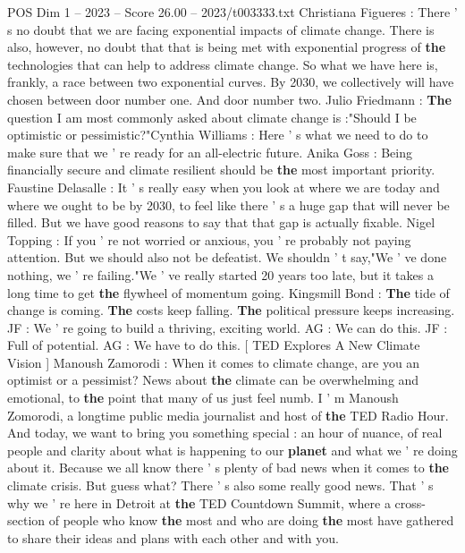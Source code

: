 \begin{textsample}{POS Dim 1 – 2023 – Score 26.00 – 2023/t003333.txt}  \label{ex:f1_pos_063}
Christiana Figueres : There ' s no doubt that we are facing exponential impacts of climate change.
There is also, however, no doubt that that is being met with exponential progress of \textbf{the} technologies that can help to address climate change.
So what we have here is, frankly, a race between two exponential curves.
By 2030, we collectively will have chosen between door number one.
And door number two.
Julio Friedmann : \textbf{The} question I am most commonly asked about climate change is :"Should I be optimistic or pessimistic?"Cynthia Williams : Here ' s what we need to do to make sure that we ' re ready for an all-electric future.
Anika Goss : Being financially secure and climate resilient should be \textbf{the} most important priority.
Faustine Delasalle : It ' s really easy when you look at where we are today and where we ought to be by 2030, to feel like there ' s a huge gap that will never be filled.
But we have good reasons to say that that gap is actually fixable.
Nigel Topping : If you ' re not worried or anxious, you ' re probably not paying attention.
But we should also not be defeatist.
We shouldn ' t say,"We ' ve done nothing, we ' re failing."We ' ve really started 20 years too late, but it takes a long time to get \textbf{the} flywheel of momentum going.
Kingsmill Bond : \textbf{The} tide of change is coming. \textbf{The} costs keep falling. \textbf{The} political pressure keeps increasing.
JF : We ' re going to build a thriving, exciting world.
AG : We can do this.
JF : Full of potential.
AG : We have to do this. [ TED Explores A New Climate Vision ] Manoush Zamorodi : When it comes to climate change, are you an optimist or a pessimist?
News about \textbf{the} climate can be overwhelming and emotional, to \textbf{the} point that many of us just feel numb.
I ' m Manoush Zomorodi, a longtime public media journalist and host of \textbf{the} TED Radio Hour.
And today, we want to bring you something special : an hour of nuance, of real people and clarity about what is happening to our \textbf{planet} and what we ' re doing about it.
Because we all know there ' s plenty of bad news when it comes to \textbf{the} climate crisis.
But guess what?
There ' s also some really good news.
That ' s why we ' re here in Detroit at \textbf{the} TED Countdown Summit, where a cross-section of people who know \textbf{the} most and who are doing \textbf{the} most have gathered to share their ideas and plans with each other and with you.

\end{textsample}
